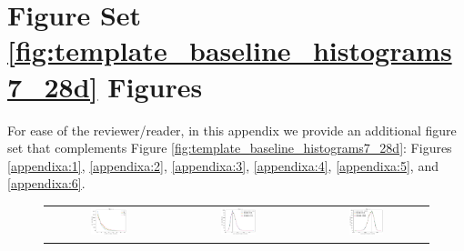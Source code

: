 \documentclass[preprintm,linenumbers]{aastex631}
\begin{document}

		\appendix
  
		\section{Figure Set \ref{fig:template_baseline_histograms7_28d} Figures}
		
		For ease of the reviewer/reader, in this appendix we provide an additional figure set that complements Figure \ref{fig:template_baseline_histograms7_28d}: Figures \ref{appendixa:1}, \ref{appendixa:2}, \ref{appendixa:3}, \ref{appendixa:4}, \ref{appendixa:5}, and \ref{appendixa:6}. 
  
		
		\begin{figure}[h]
			\centering
			\begin{tabular}{c c c}
				
				\includegraphics[width=0.3\textwidth]{results/histograms_templates_tscale/hist_first_year_one_snap_v4_0_10yrs_db_noDD_noTwi_doALLTemplateMetrics_reduceNTemplate_u_noDD_noTwi.pdf} &
				\includegraphics[width=0.3\textwidth]{results/histograms_templates_tscale/hist_first_year_one_snap_v4_0_10yrs_db_noDD_noTwi_doALLTemplateMetrics_reduceSeeingTemplate_u_noDD_noTwi.pdf} &
				\includegraphics[width=0.3\textwidth]{results/histograms_templates_tscale/hist_first_year_one_snap_v4_0_10yrs_db_noDD_noTwi_doALLTemplateMetrics_reduceDepthTemplate_u_noDD_noTwi.pdf} \\
				

\end{tabular}
\end{figure}
\end{document}
